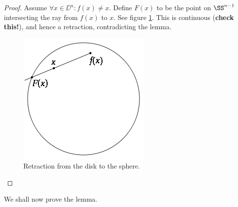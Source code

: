 \documentclass[10pt,a4paper,twoside,openany,hidelinks]{book}
\begin{document}
\begin{proof}
Assume $\forall x \in \DD^n \colon f(x) \neq x$.
Define $F(x)$ to be the point on $\SS^{n-1}$ intersecting the ray from $f(x)$ to $x$. See figure \ref{retraction_lemma}.
This is continuous (\textbf{check this!}), and hence a retraction, contradicting the lemma.
\begin{figure}[h!]
\begin{center}
\caption{Retraction from the disk to the sphere.}
\label{retraction_lemma}
\includegraphics[scale=0.7]{sources/retraction_lemma}
\end{center}
\end{figure}
\end{proof}
We shall now prove the lemma.
\end{document}
